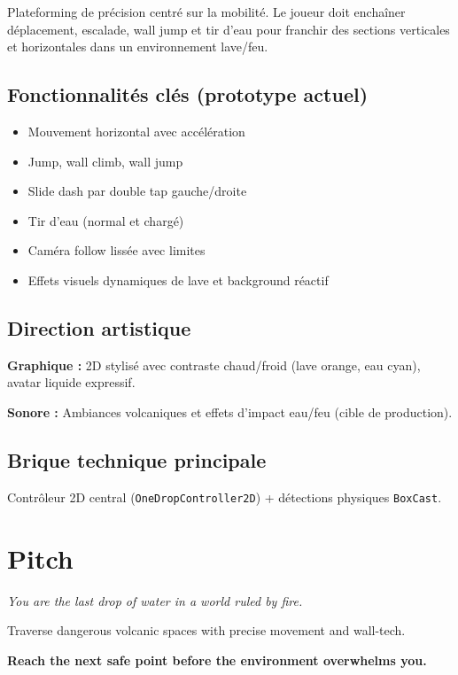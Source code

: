 ﻿\documentclass[12pt,a4paper]{article}
\begin{document}
Plateforming de précision centré sur la mobilité. Le joueur doit enchaîner déplacement, escalade, wall jump et tir d'eau pour franchir des sections verticales et horizontales dans un environnement lave/feu.

\subsection{Fonctionnalités clés (prototype actuel)}

\begin{itemize}[noitemsep]
    \item Mouvement horizontal avec accélération
    \item Jump, wall climb, wall jump
    \item Slide dash par double tap gauche/droite
    \item Tir d'eau (normal et chargé)
    \item Caméra follow lissée avec limites
    \item Effets visuels dynamiques de lave et background réactif
\end{itemize}

\subsection{Direction artistique}

\textbf{Graphique :} 2D stylisé avec contraste chaud/froid (lave orange, eau cyan), avatar liquide expressif.

\textbf{Sonore :} Ambiances volcaniques et effets d'impact eau/feu (cible de production).

\subsection{Brique technique principale}

Contrôleur 2D central (\texttt{OneDropController2D}) + détections physiques \texttt{BoxCast}.

\section{Pitch}

\begin{tcolorbox}[colback=fireorange!10,colframe=fireorange!80!black,enhanced,center title,fonttitle=\bfseries,title=Elevator Pitch]
\centering
\textit{You are the last drop of water in a world ruled by fire.}

\vspace{0.2cm}
Traverse dangerous volcanic spaces with precise movement and wall-tech.

\vspace{0.2cm}
\textbf{Reach the next safe point before the environment overwhelms you.}
\end{tcolorbox}
\end{document}
